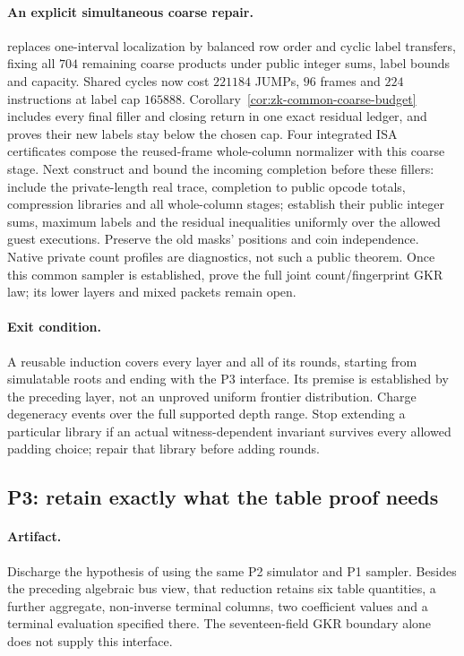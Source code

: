\paragraph{An explicit simultaneous coarse repair.}  replaces one-interval localization by balanced row order and cyclic label transfers, fixing all $704$ remaining coarse products under public integer sums, label bounds and capacity. Shared cycles now cost $221184$ JUMPs, $96$ frames and $224$ instructions at label cap $165888$. Corollary~\ref{cor:zk-common-coarse-budget} includes every final filler and closing return in one exact residual ledger, and proves their new labels stay below the chosen cap. Four integrated ISA certificates compose the reused-frame whole-column normalizer with this coarse stage. Next construct and bound the incoming completion before these fillers: include the private-length real trace, completion to public opcode totals, compression libraries and all whole-column stages; establish their public integer sums, maximum labels and the residual inequalities uniformly over the allowed guest executions. Preserve the old masks' positions and coin independence. Native private count profiles are diagnostics, not such a public theorem. Once this common sampler is established, prove the full joint count/fingerprint GKR law; its lower layers and mixed packets remain open.

\paragraph{Exit condition.} A reusable induction covers every layer and all of its rounds, starting from simulatable roots and ending with the P3 interface. Its premise is established by the preceding layer, not an unproved uniform frontier distribution. Charge degeneracy events over the full supported depth range. Stop extending a particular library if an actual witness-dependent invariant survives every allowed padding choice; repair that library before adding rounds.

\subsection{P3: retain exactly what the table proof needs}

\paragraph{Artifact.} Discharge the hypothesis of  using the same P2 simulator and P1 sampler. Besides the preceding algebraic bus view, that reduction retains six table quantities, a further aggregate, non-inverse terminal columns, two coefficient values and a terminal evaluation specified there. The seventeen-field GKR boundary alone does not supply this interface.

